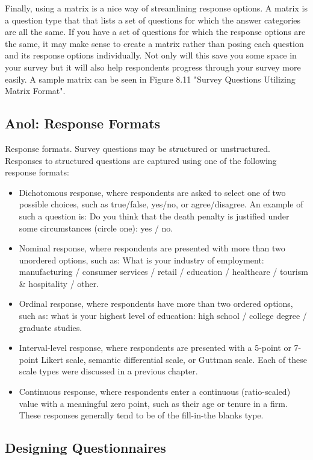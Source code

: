 Finally, using a matrix is a nice way of streamlining response options. A matrix is a question type that that lists a set of questions for which the answer categories are all the same. If you have a set of questions for which the response options are the same, it may make sense to create a matrix rather than posing each question and its response options individually. Not only will this save you some space in your survey but it will also help respondents progress through your survey more easily. A sample matrix can be seen in Figure 8.11 "Survey Questions Utilizing Matrix Format".

\subsection{Anol: Response Formats}

Response formats. Survey questions may be structured or unstructured. Responses to structured questions are captured using one of the following response formats:

\begin{itemize}
\item Dichotomous response, where respondents are asked to select one of two possible choices, such as true/false, yes/no, or agree/disagree. An example of such a question is: Do you think that the death penalty is justified under some circumstances (circle one): yes / no.
\item Nominal response, where respondents are presented with more than two unordered options, such as: What is your industry of employment: manufacturing / consumer services / retail / education / healthcare / tourism \& hospitality / other.
\item Ordinal response, where respondents have more than two ordered options, such as: what is your highest level of education: high school / college degree / graduate studies.
\item Interval-level response, where respondents are presented with a 5-point or 7-point Likert scale, semantic differential scale, or Guttman scale. Each of these scale types were discussed in a previous chapter.
\item Continuous response, where respondents enter a continuous (ratio-scaled) value with a meaningful zero point, such as their age or tenure in a firm. These responses generally tend to be of the fill-in-the blanks type.
\end{itemize}

\subsection{Designing Questionnaires}

